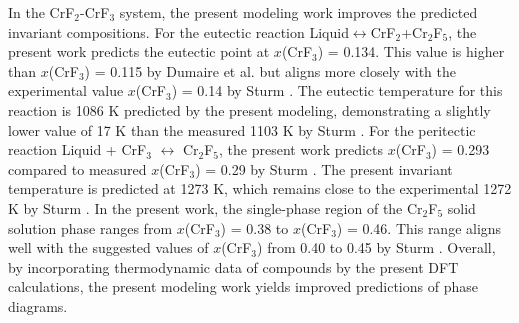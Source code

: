 In the CrF$_2$-CrF$_3$ system, the present modeling work improves the predicted invariant compositions. For the eutectic reaction Liquid$\leftrightarrow$CrF$_2$+Cr$_2$F$_5$, the present work predicts the eutectic point at $x$(CrF$_3$) = 0.134. This value is higher than $x$(CrF$_3$) = 0.115 by Dumaire et al. \cite{dumaire2021thermodynamic} but aligns more closely with the experimental value $x$(CrF$_3$) = 0.14 by Sturm \cite{sturm1962phase}. The eutectic temperature for this reaction is 1086 K predicted by the present modeling, demonstrating a slightly lower value of 17 K than the measured 1103 K by Sturm \cite{sturm1962phase}. For the peritectic reaction Liquid + CrF$_3$ $\leftrightarrow$ Cr$_2$F$_5$, the present work predicts $x$(CrF$_3$) = 0.293 compared to measured $x$(CrF$_3$) = 0.29 by Sturm \cite{sturm1962phase}. The present invariant temperature is predicted at 1273 K, which remains close to the experimental 1272 K by Sturm \cite{sturm1962phase}. In the present work, the single-phase region of the Cr$_2$F$_5$ solid solution phase ranges from $x$(CrF$_3$) = 0.38 to $x$(CrF$_3$) = 0.46. This range aligns well with the suggested values of $x$(CrF$_3$) from 0.40 to 0.45 by Sturm \cite{sturm1962phase}. Overall, by incorporating thermodynamic data of compounds by the present DFT calculations, the present modeling work yields improved predictions of phase diagrams.

